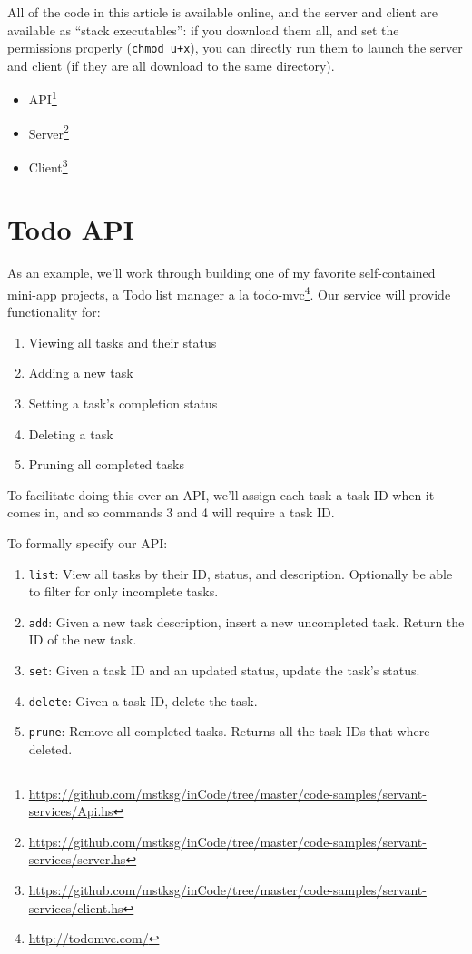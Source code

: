 \documentclass[]{article}
\renewcommand{\href}[2]{#2\footnote{\url{#1}}}
\begin{document}
All of the code in this article is available online, and the server and client
are available as ``stack executables'': if you download them all, and set the
permissions properly (\texttt{chmod\ u+x}), you can directly run them to launch
the server and client (if they are all download to the same directory).

\begin{itemize}
\tightlist
\item
  \href{https://github.com/mstksg/inCode/tree/master/code-samples/servant-services/Api.hs}{API}
\item
  \href{https://github.com/mstksg/inCode/tree/master/code-samples/servant-services/server.hs}{Server}
\item
  \href{https://github.com/mstksg/inCode/tree/master/code-samples/servant-services/client.hs}{Client}
\end{itemize}

\hypertarget{todo-api}{%
\section{Todo API}\label{todo-api}}

As an example, we'll work through building one of my favorite self-contained
mini-app projects, a \href{http://todomvc.com/}{Todo list manager a la
todo-mvc}. Our service will provide functionality for:

\begin{enumerate}
\def\labelenumi{\arabic{enumi}.}
\tightlist
\item
  Viewing all tasks and their status
\item
  Adding a new task
\item
  Setting a task's completion status
\item
  Deleting a task
\item
  Pruning all completed tasks
\end{enumerate}

To facilitate doing this over an API, we'll assign each task a task ID when it
comes in, and so commands 3 and 4 will require a task ID.

To formally specify our API:

\begin{enumerate}
\def\labelenumi{\arabic{enumi}.}
\tightlist
\item
  \texttt{list}: View all tasks by their ID, status, and description. Optionally
  be able to filter for only incomplete tasks.
\item
  \texttt{add}: Given a new task description, insert a new uncompleted task.
  Return the ID of the new task.
\item
  \texttt{set}: Given a task ID and an updated status, update the task's status.
\item
  \texttt{delete}: Given a task ID, delete the task.
\item
  \texttt{prune}: Remove all completed tasks. Returns all the task IDs that
  where deleted.
\end{enumerate}
\end{document}
